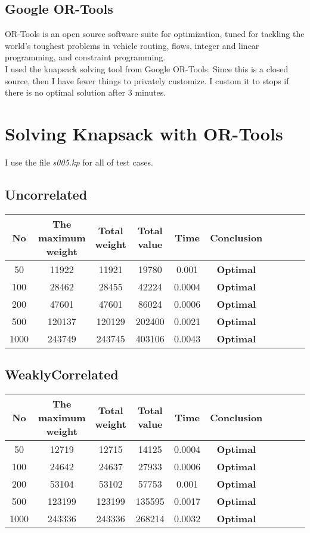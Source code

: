 \documentclass{article}
\begin{document}
\subsection{Google OR-Tools}
OR-Tools is an open source software suite for optimization, tuned for tackling the world's toughest problems in vehicle routing, flows, integer and linear programming, and constraint programming.\\

I used the knapsack solving tool from Google OR-Tools. Since this is a closed source, then I have fewer things to privately customize. I custom it to stops if there is no optimal solution after 3 minutes. 

\section{Solving Knapsack with OR-Tools} 
I use the file \textit{s005.kp} for all of test cases.
\subsection{Uncorrelated}
    \begin{center}
        \begin{tabular}{|c|c| c|c| c|c| c|c| c|c|}
        \hline
            No& The maximum weight & Total weight & Total value& Time&Conclusion \\
        \hline
            50 & 11922 & 11921 & 19780 & 0.001 & \textbf{Optimal}\\
            100 & 28462 & 28455 & 42224 & 0.0004 & \textbf{Optimal}\\
            200 & 47601 & 47601 & 86024 & 0.0006 & \textbf{Optimal}\\
            500 & 120137 & 120129 & 202400 & 0.0021 & \textbf{Optimal}\\
            1000 & 243749 & 243745 & 403106 & 0.0043 & \textbf{Optimal}\\
    \hline
        \hline 
        \end{tabular}
    \end{center}
\subsection{WeaklyCorrelated}
    \begin{center}
        \begin{tabular}{|c|c| c|c| c|c| c|c| c|c|}
        \hline
            No& The maximum weight & Total weight & Total value& Time&Conclusion \\
        \hline
            50 & 12719 & 12715 & 14125 & 0.0004 & \textbf{Optimal}\\
            100 & 24642 & 24637 & 27933 & 0.0006 & \textbf{Optimal}\\
            200 & 53104 & 53102 & 57753 & 0.001 & \textbf{Optimal}\\
            500 & 123199 & 123199 & 135595 & 0.0017 & \textbf{Optimal}\\
            1000 & 243336 & 243336 & 268214 & 0.0032 & \textbf{Optimal}\\
    \hline
        \hline 
        \end{tabular}
    \end{center}
\end{document}

